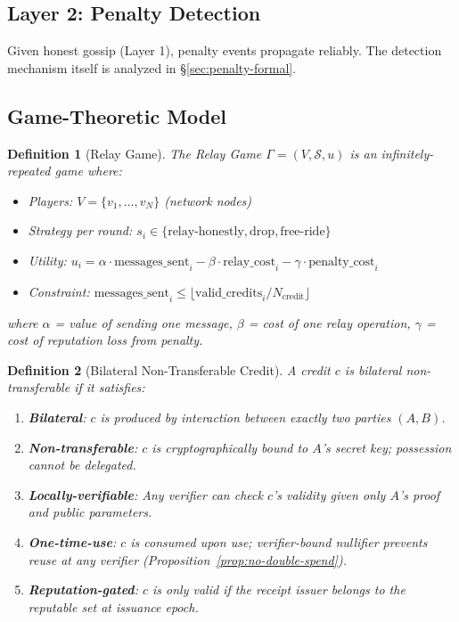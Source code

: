 \documentclass[11pt,a4paper]{article}
\newtheorem{definition}{Definition}
\begin{document}
\subsection{Layer 2: Penalty Detection}
\label{sec:penalty-detection}

Given honest gossip (Layer 1), penalty events propagate reliably. The detection mechanism itself is analyzed in \S\ref{sec:penalty-formal}.

\subsection{Game-Theoretic Model}

\begin{definition}[Relay Game]
The Relay Game $\Gamma = (V, \mathcal{S}, u)$ is an infinitely-repeated game where:
\begin{itemize}[nosep]
    \item Players: $V = \{v_1, \ldots, v_N\}$ (network nodes)
    \item Strategy per round: $s_i \in \{\text{relay-honestly}, \text{drop}, \text{free-ride}\}$
    \item Utility: $u_i = \alpha \cdot \text{messages\_sent}_i - \beta \cdot \text{relay\_cost}_i - \gamma \cdot \text{penalty\_cost}_i$
    \item Constraint: $\text{messages\_sent}_i \leq \lfloor \text{valid\_credits}_i / N_{\text{credit}} \rfloor$
\end{itemize}
where $\alpha$ = value of sending one message, $\beta$ = cost of one relay operation, $\gamma$ = cost of reputation loss from penalty.
\end{definition}

\begin{definition}[Bilateral Non-Transferable Credit]
A credit $c$ is \emph{bilateral non-transferable} if it satisfies:
\begin{enumerate}[nosep]
    \item \textbf{Bilateral}: $c$ is produced by interaction between exactly two parties $(A, B)$.
    \item \textbf{Non-transferable}: $c$ is cryptographically bound to $A$'s secret key; possession cannot be delegated.
    \item \textbf{Locally-verifiable}: Any verifier can check $c$'s validity given only $A$'s proof and public parameters.
    \item \textbf{One-time-use}: $c$ is consumed upon use; verifier-bound nullifier prevents reuse at any verifier (Proposition~\ref{prop:no-double-spend}).
    \item \textbf{Reputation-gated}: $c$ is only valid if the receipt issuer belongs to the reputable set at issuance epoch.
\end{enumerate}
\end{definition}
\end{document}
